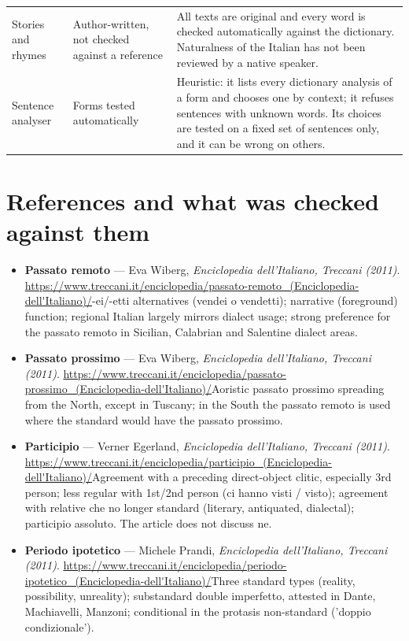 \documentclass[11pt,a4paper,twoside,openright]{book}
\begin{document}
{\begin{xltabular}{\linewidth}{@{}p{3.6cm} p{2.6cm} L@{}}
Stories and rhymes & Author-written, not checked against a reference & All texts are original and every word is checked automatically against the dictionary. Naturalness of the Italian has not been reviewed by a native speaker. \\
Sentence analyser & Forms tested automatically & Heuristic: it lists every dictionary analysis of a form and chooses one by context; it refuses sentences with unknown words. Its choices are tested on a fixed set of sentences only, and it can be wrong on others. \\
\bottomrule
\end{xltabular}}
\section{References and what was checked against them}
\begin{itemize}
\item\relax \textbf{Passato remoto} --- Eva Wiberg, \textit{Enciclopedia dell'Italiano, Treccani (2011)}. \url{https://www.treccani.it/enciclopedia/passato-remoto_(Enciclopedia-dell'Italiano)/}\newline -ei/-etti alternatives (vendei o vendetti); narrative (foreground) function; regional Italian largely mirrors dialect usage; strong preference for the passato remoto in Sicilian, Calabrian and Salentine dialect areas.
\item\relax \textbf{Passato prossimo} --- Eva Wiberg, \textit{Enciclopedia dell'Italiano, Treccani (2011)}. \url{https://www.treccani.it/enciclopedia/passato-prossimo_(Enciclopedia-dell'Italiano)/}\newline Aoristic passato prossimo spreading from the North, except in Tuscany; in the South the passato remoto is used where the standard would have the passato prossimo.
\item\relax \textbf{Participio} --- Verner Egerland, \textit{Enciclopedia dell'Italiano, Treccani (2011)}. \url{https://www.treccani.it/enciclopedia/participio_(Enciclopedia-dell'Italiano)/}\newline Agreement with a preceding direct-object clitic, especially 3rd person; less regular with 1st/2nd person (ci hanno visti / visto); agreement with relative che no longer standard (literary, antiquated, dialectal); participio assoluto. The article does not discuss ne.
\item\relax \textbf{Periodo ipotetico} --- Michele Prandi, \textit{Enciclopedia dell'Italiano, Treccani (2011)}. \url{https://www.treccani.it/enciclopedia/periodo-ipotetico_(Enciclopedia-dell'Italiano)/}\newline Three standard types (reality, possibility, unreality); substandard double imperfetto, attested in Dante, Machiavelli, Manzoni; conditional in the protasis non-standard ('doppio condizionale').

\end{itemize}
\end{document}
